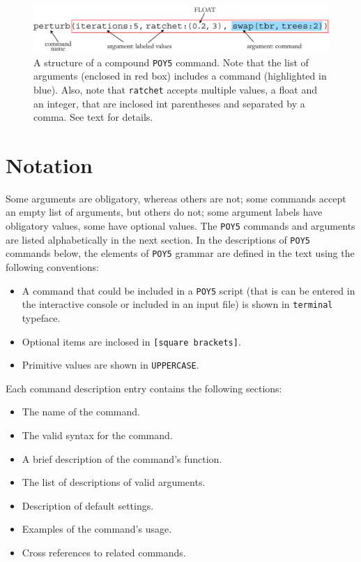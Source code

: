 \documentclass[11pt]{book}
\newcommand{\commandstyle}[1]{\texttt{#1}}
\newcommand{\poycommand}[1]{\commandstyle{#1}}
\newcommand{\poyargument}[1]{\commandstyle{#1}}
\newcommand{\poy}{\commandstyle{POY5}\xspace}
\begin{document}
\begin{figure}[htbp]
   \centering
   \includegraphics[width=1.0\textwidth]{doc/figures/fig-poycommand2.jpg}
   \caption{A structure of a compound \poy command. Note that the list of arguments
   (enclosed in red box) includes a command (highlighted in blue). Also, note that
   \poyargument{ratchet} accepts multiple values, a float and an integer, that are inclosed int
   parentheses and separated by a comma. See text for details.}
   \label{compositecommand}
\end{figure}

\section{Notation}

Some arguments are obligatory, whereas others are not; some commands accept an
empty list of arguments, but others do not; some argument labels have
obligatory values, some have optional values. The \poy commands and arguments are listed alphabetically 
in the next section. In the descriptions of \poy commands below, the elements of \poy 
grammar are defined in the text using the following conventions:

\begin{itemize}
    \item A command that could be included in a \poy script (that is can be entered in the
    	interactive console or included in an input file) is shown in \poycommand{terminal} typeface.
    \item Optional items are inclosed in \poycommand{[square brackets]}.
    \item Primitive values are shown in \poycommand{UPPERCASE}.
\end{itemize}
\bigskip
Each command description entry contains the following sections:

\begin{itemize}
    \item The name of the command.
    \item The valid syntax for the command.
    \item A brief description of the command's function.
    \item The list of descriptions of valid arguments.
    \item Description of default settings.
    \item Examples of the command's usage.
    \item Cross references to related commands. 
\end{itemize}
\end{document}
